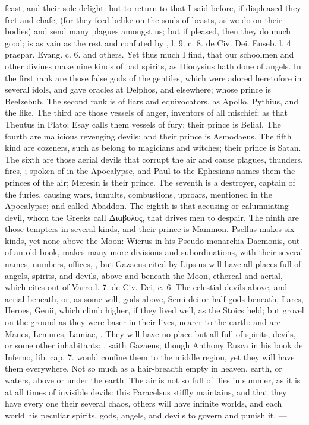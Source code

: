 {{feast, and their sole delight: but to return to that I said before, if
displeased they fret and chafe, (for they feed belike on the souls of
beasts, as we do on their bodies) and send many plagues amongst us; but
if pleased, then they do much good; is as vain as the rest and confuted
by \Austin{}, l. 9. c. 8. de Civ. Dei. Euseb. l. 4. praepar. Evang. c. 6.
and others. Yet thus much I find, that our schoolmen and other
divines make nine kinds of bad spirits, as Dionysius hath done of
angels. In the first rank are those false gods of the gentiles, which
were adored heretofore in several idols, and gave oracles at Delphos,
and elsewhere; whose prince is Beelzebub. The second rank is of liars
and equivocators, as Apollo, Pythius, and the like. The third are those
vessels of anger, inventors of all mischief; as that Theutus in Plato;
Esay calls them vessels of fury; their prince is Belial. The
fourth are malicious revenging devils; and their prince is Asmodaeus.
The fifth kind are cozeners, such as belong to magicians and witches;
their prince is Satan. The sixth are those aerial devils that
corrupt the air and cause plagues, thunders, fires, \etc{}; spoken
of in the Apocalypse, and Paul to the Ephesians names them the princes
of the air; Meresin is their prince. The seventh is a destroyer,
captain of the furies, causing wars, tumults, combustions, uproars,
mentioned in the Apocalypse; and called Abaddon. The eighth is that
accusing or calumniating devil, whom the Greeks call \textgreek{Διαβολος}, that
drives men to despair. The ninth are those tempters in several kinds,
and their prince is Mammon. Psellus makes six kinds, yet none above the
Moon: Wierus in his Pseudo-monarchia Daemonis, out of an old book,
makes many more divisions and subordinations, with their several names,
numbers, offices, \etc{}, but Gazaeus cited by Lipsius will have all
places full of angels, spirits, and devils, above and beneath the
Moon, ethereal and aerial, which \Austin{} cites out of Varro l. 7.
de Civ. Dei, c. 6. The celestial devils above, and aerial beneath, or,
as some will, gods above, Semi-dei or half gods beneath, Lares, Heroes,
Genii, which climb higher, if they lived well, as the Stoics held; but
grovel on the ground as they were baser in their lives, nearer to the
earth: and are Manes, Lemures, Lamiae, \etc{}. They will have no
place but all full of spirits, devils, or some other inhabitants;
, saith
Gazaeus; though Anthony Rusca in his book de Inferno, lib. 
cap. 7. would confine them to the middle region, yet they will have
them everywhere. Not so much as a hair-breadth empty in heaven, earth,
or waters, above or under the earth. The air is not so full of flies in
summer, as it is at all times of invisible devils: this
Paracelsus stiffly maintains, and that they have every one their
several chaos, others will have infinite worlds, and each world his
peculiar spirits, gods, angels, and devils to govern and punish it.
---

}}
